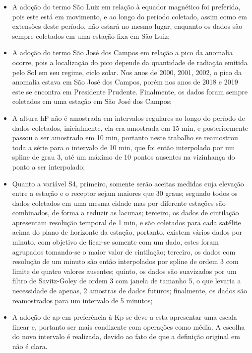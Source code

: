 \begin{itemize}
\item A adoção do termo São Luiz em relação à equador magnético foi preferida, pois este está em movimento, e ao longo do período coletado, assim como em extensões deste período, não estará no mesmo lugar, enquanto os dados são sempre coletados em uma estação fixa em São Luiz;
\item A adoção do termo São José dos Campos em relação a pico da anomalia ocorre, pois a localização do pico depende da quantidade de radiação emitida pelo Sol em seu regime, ciclo solar. Nos anos de 2000, 2001, 2002, o pico da anomalia estava em São José dos Campos, porém nos anos de 2018 e 2019 este se encontra em Presidente Prudente. Finalmente, os dados foram sempre coletados em uma estação em São José dos Campos;
\item A altura hF não é amostrada em intervalos regulares ao longo do período de dados coletados, inicialmente, ela era amostrada em 15 min, e posteriormente passou a ser amostrado em 10 min, portanto neste trabalho se reamostrou toda a série para o intervalo de 10 min, que foi então interpolado por um spline de grau 3, até um máximo de 10 pontos ausentes na vizinhança do ponto a ser interpolado;
\item Quanto a variável S4, primeiro, somente serão aceitas medidas cuja elevação entre a estação e o receptor sejam maiores que 30 graus; segundo todos os dados coletados em uma mesma cidade mas por diferente estações são combinados, de forma a reduzir as lacunas; terceiro, os dados de cintilação apresentam resolução temporal de 1 min, e são coletados para cada satélite acima do plano de horizonte da estação, portanto, existem vários dados por minuto, com objetivo de ficar-se somente com um dado, estes foram agrupados tomando-se o maior valor de cintilação; terceiro, os dados com resolução de um minuto são então interpolados por spline de ordem 3 com limite de quatro valores ausentes; quinto, os dados são suavizados por um filtro de Savitz-Goley de ordem 3 com janela de tamanho 5, o que levaria a necessidade de apenas, 2 amostras de dados futuros; finalmente, os dados são reamostrados para um intervalo de 5 minutos;
\item A adoção de ap em preferência à Kp se deve a esta apresentar uma escala linear e, portanto ser mais condizente com operações como média. A escolha do novo intervalo é realizada, devido ao fato de que a definição original em \cite{REZENDE:2009} não é clara.
\end{itemize}

